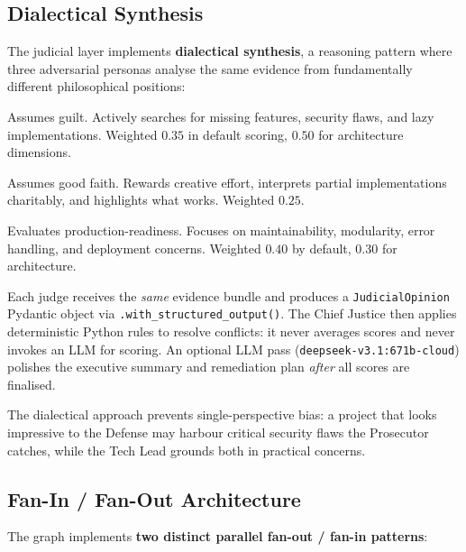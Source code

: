 \documentclass[11pt,a4paper]{article}
\begin{document}
\subsection{Dialectical Synthesis}

The judicial layer implements \textbf{dialectical synthesis}, a reasoning pattern
where three adversarial personas analyse the same evidence from fundamentally
different philosophical positions:

\begin{description}[leftmargin=1.5cm,style=nextline]
    \item[Prosecutor (\textit{adversarial})]
        Assumes guilt.  Actively searches for missing features, security flaws,
        and lazy implementations.  Weighted $0.35$ in default scoring, $0.50$
        for architecture dimensions.

    \item[Defense (\textit{forgiving})]
        Assumes good faith.  Rewards creative effort, interprets partial
        implementations charitably, and highlights what works.  Weighted $0.25$.

    \item[Tech Lead (\textit{pragmatic})]
        Evaluates production-readiness.  Focuses on maintainability, modularity,
        error handling, and deployment concerns.  Weighted $0.40$ by default,
        $0.30$ for architecture.
\end{description}

Each judge receives the \emph{same} evidence bundle and produces a
\texttt{JudicialOpinion} Pydantic object via \texttt{.with\_structured\_output()}.
The Chief Justice then applies deterministic Python rules to resolve
conflicts: it never averages scores and never invokes an LLM for scoring.  An optional
LLM pass (\texttt{deepseek-v3.1:671b-cloud}) polishes the executive summary
and remediation plan \emph{after} all scores are finalised.

The dialectical approach prevents single-perspective bias: a project that
looks impressive to the Defense may harbour critical security flaws
the Prosecutor catches, while the Tech Lead grounds both in practical concerns.

\subsection{Fan-In / Fan-Out Architecture}

The graph implements \textbf{two distinct parallel fan-out / fan-in patterns}:
\end{document}
